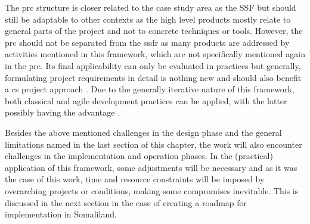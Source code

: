 The \acrshort{prc} structure is closer related to the case study area as the SSF but should still be adaptable to other contexts as the high level products mostly relate to general parts of the project and not to concrete techniques or tools. However, the \acrshort{prc} should not be separated from the \acrshort{ssdr} as many products are addressed by activities mentioned in this framework, which are not specifically mentioned again in the \acrshort{prc}. Its final applicability can only be evaluated in practices but generally, formulating project requirements in detail is nothing new and should also benefit a \acrshort{cs} project approach \autocite{wiegersSoftwareRequirements2013,youngEffectiveRequirementsPractices2001,youngProjectRequirementsGuide2006}. Due to the generally iterative nature of this framework, both classical and agile development practices can be applied, with the latter possibly having the advantage \autocite{confortoCanAgileProject2014,ManifestoAgileSoftware}.\newline

Besides the above mentioned challenges in the design phase and the general limitations named in the last section of this chapter, the work will also encounter challenges in the implementation and operation phases. In the (practical) application of this framework, some adjustments will be necessary and as it was the case of this work, time and resource constraints will be imposed by overarching projects or conditions, making some compromises inevitable. This is discussed in the next section in the case of creating a roadmap for implementation in Somaliland.


